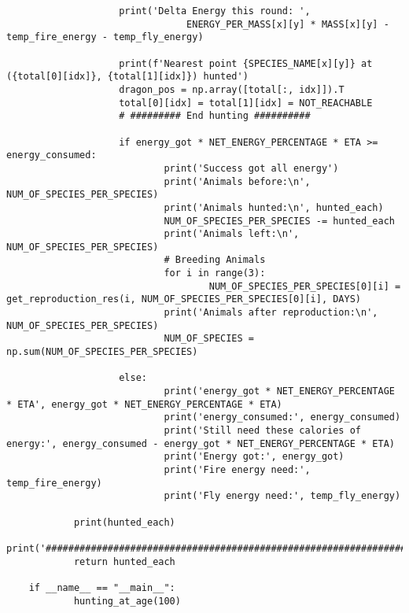 \begin{lstlisting}
					print('Delta Energy this round: ',
								ENERGY_PER_MASS[x][y] * MASS[x][y] - temp_fire_energy - temp_fly_energy)
	
					print(f'Nearest point {SPECIES_NAME[x][y]} at ({total[0][idx]}, {total[1][idx]}) hunted')
					dragon_pos = np.array([total[:, idx]]).T
					total[0][idx] = total[1][idx] = NOT_REACHABLE
					# ######### End hunting ##########
	
					if energy_got * NET_ENERGY_PERCENTAGE * ETA >= energy_consumed:
							print('Success got all energy')
							print('Animals before:\n', NUM_OF_SPECIES_PER_SPECIES)
							print('Animals hunted:\n', hunted_each)
							NUM_OF_SPECIES_PER_SPECIES -= hunted_each
							print('Animals left:\n', NUM_OF_SPECIES_PER_SPECIES)
							# Breeding Animals
							for i in range(3):
									NUM_OF_SPECIES_PER_SPECIES[0][i] = get_reproduction_res(i, NUM_OF_SPECIES_PER_SPECIES[0][i], DAYS)
							print('Animals after reproduction:\n', NUM_OF_SPECIES_PER_SPECIES)
							NUM_OF_SPECIES = np.sum(NUM_OF_SPECIES_PER_SPECIES)
	
					else:
							print('energy_got * NET_ENERGY_PERCENTAGE * ETA', energy_got * NET_ENERGY_PERCENTAGE * ETA)
							print('energy_consumed:', energy_consumed)
							print('Still need these calories of energy:', energy_consumed - energy_got * NET_ENERGY_PERCENTAGE * ETA)
							print('Energy got:', energy_got)
							print('Fire energy need:', temp_fire_energy)
							print('Fly energy need:', temp_fly_energy)
	
			print(hunted_each)
			print('################################################################')
			return hunted_each
	
	if __name__ == "__main__":
			hunting_at_age(100)
\end{lstlisting}

% 